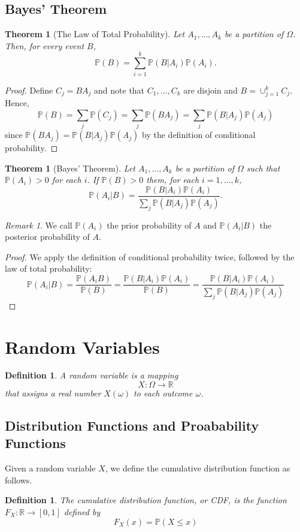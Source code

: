 \documentclass{article}
\newtheorem{theorem}[counter]{Theorem}
\newtheorem{definition}[counter]{Definition}
\theoremstyle{remark}
\newtheorem{remark}[counter]{Remark}
\newcommand{\1}{\mathbf{1}}
\newcommand{\Prob}{\mathbb{P}}
\newcommand{\R}{\mathbb{R}}
\begin{document}
\subsection{Bayes' Theorem}
\begin{theorem}[The Law of Total Probability]
	Let $A_1,...,A_k$ be a partition of $\Omega$. Then, for every event $B$,
	\[
	\Prob(B) = \sum_{i=1}^k \Prob(B|A_i)\Prob(A_i).
	\]
\end{theorem}
\begin{proof}
	Define $C_j = B A_j$ and note that $C_1, ..., C_k$ are disjoin and $B = \cup_{j=1}^k C_j$. Hence,
	\[
	\Prob(B) = \sum_j\Prob(C_j) = \sum_j \Prob(B A_j) = \sum_{j} \Prob(B|A_j)\Prob(A_j)
	\]
	since $\Prob(B A_j) = \Prob(B|A_j)\Prob(A_j)$ by the definition of conditional probability.
\end{proof}
\begin{theorem}[Bayes' Theorem]
	Let $A_1, ..., A_k$ be a partition of $\Omega$ such that $\Prob(A_i) > 0$ for each $i$. If $\Prob(B) > 0$ them, for each $i = 1,...,k$,
	\[
	\Prob(A_i|B) = \frac{\Prob(B|A_i)\Prob(A_i)}{\sum_{j} \Prob(B|A_j)\Prob(A_j)}.
	\]
\end{theorem}
\begin{remark}
	We call $\Prob(A_i)$ the prior probability of $A$ and $\Prob(A_i|B)$ the posterior probability of $A$.
\end{remark}
\begin{proof}
	We apply the definition of conditional probability twice, followed by the law of total probability:
	\[
	\Prob(A_i|B) = \frac{\Prob(A_iB)}{\Prob(B)} = \frac{\Prob(B|A_i)\Prob(A_i)}{\Prob(B)} =  \frac{\Prob(B|A_i)\Prob(A_i)}{\sum_{j} \Prob(B|A_j)\Prob(A_j)}
	\]
\end{proof}

\section{Random Variables}
\begin{definition}
	A random variable is a mapping
	\[
	X: \Omega \to \R
	\]
	that assigns a real number $X(\omega)$ to each outcome $\omega$.
\end{definition}
\subsection{Distribution Functions and Proabability Functions}
Given a random variable $X$, we define the cumulative distribution function as follows.
\begin{definition}
	The cumulative distribution function, or CDF, is the function $F_X : \R \to [0,1]$ defined by
	\[
	F_X(x) = \Prob(X \leq x)
	\]
\end{definition}
\end{document}
